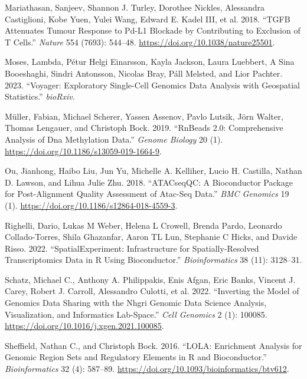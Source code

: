 \begin{cslreferences}
\leavevmode\hypertarget{ref-Mariathasan2018}{}%
Mariathasan, Sanjeev, Shannon J. Turley, Dorothee Nickles, Alessandra Castiglioni, Kobe Yuen, Yulei Wang, Edward E. Kadel III, et al. 2018. ``TGFB Attenuates Tumour Response to Pd-L1 Blockade by Contributing to Exclusion of T Cells.'' \emph{Nature} 554 (7693): 544--48. \url{https://doi.org/10.1038/nature25501}.

\leavevmode\hypertarget{ref-moses23}{}%
Moses, Lambda, Pétur Helgi Einarsson, Kayla Jackson, Laura Luebbert, A Sina Booeshaghi, Sindri Antonsson, Nicolas Bray, Páll Melsted, and Lior Pachter. 2023. ``Voyager: Exploratory Single-Cell Genomics Data Analysis with Geospatial Statistics.'' \emph{bioRxiv}.

\leavevmode\hypertarget{ref-Mueller2019}{}%
Müller, Fabian, Michael Scherer, Yassen Assenov, Pavlo Lutsik, Jörn Walter, Thomas Lengauer, and Christoph Bock. 2019. ``RnBeads 2.0: Comprehensive Analysis of Dna Methylation Data.'' \emph{Genome Biology} 20 (1). \url{https://doi.org/10.1186/s13059-019-1664-9}.

\leavevmode\hypertarget{ref-Ou2018}{}%
Ou, Jianhong, Haibo Liu, Jun Yu, Michelle A. Kelliher, Lucio H. Castilla, Nathan D. Lawson, and Lihua Julie Zhu. 2018. ``ATACseqQC: A Bioconductor Package for Post-Alignment Quality Assessment of Atac-Seq Data.'' \emph{BMC Genomics} 19 (1). \url{https://doi.org/10.1186/s12864-018-4559-3}.

\leavevmode\hypertarget{ref-rig22}{}%
Righelli, Dario, Lukas M Weber, Helena L Crowell, Brenda Pardo, Leonardo Collado-Torres, Shila Ghazanfar, Aaron TL Lun, Stephanie C Hicks, and Davide Risso. 2022. ``SpatialExperiment: Infrastructure for Spatially-Resolved Transcriptomics Data in R Using Bioconductor.'' \emph{Bioinformatics} 38 (11): 3128--31.

\leavevmode\hypertarget{ref-Schatz2022}{}%
Schatz, Michael C., Anthony A. Philippakis, Enis Afgan, Eric Banks, Vincent J. Carey, Robert J. Carroll, Alessandro Culotti, et al. 2022. ``Inverting the Model of Genomics Data Sharing with the Nhgri Genomic Data Science Analysis, Visualization, and Informatics Lab-Space.'' \emph{Cell Genomics} 2 (1): 100085. \url{https://doi.org/10.1016/j.xgen.2021.100085}.

\leavevmode\hypertarget{ref-Sheffield2016}{}%
Sheffield, Nathan C., and Christoph Bock. 2016. ``LOLA: Enrichment Analysis for Genomic Region Sets and Regulatory Elements in R and Bioconductor.'' \emph{Bioinformatics} 32 (4): 587--89. \url{https://doi.org/10.1093/bioinformatics/btv612}.


\end{cslreferences}
